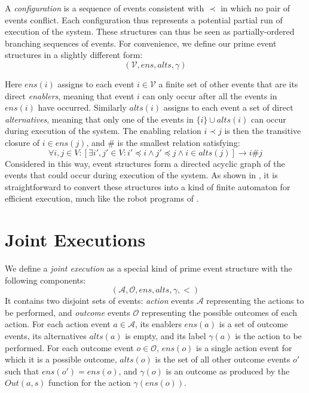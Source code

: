A \emph{configuration} is a sequence of events consistent with $\prec$
in which no pair of events conflict. Each configuration thus represents
a potential partial run of execution of the system. These structures
can thus be seen as partially-ordered branching sequences of events.
For convenience, we define our prime event structures in a slightly
different form:\[
(\mathcal{V},ens,alts,\gamma)\]


Here $ens(i)$ assigns to each event $i\in\mathcal{V}$ a finite set
of other events that are its direct \emph{enablers}, meaning that
event $i$ can only occur after all the events in $ens(i)$ have occurred.
Similarly $alts(i)$ assigns to each event a set of direct \emph{alternatives},
meaning that only one of the events in $\{i\}\cup alts(i)$ can occur
during execution of the system. The enabling relation $i\prec j$
is then the transitive closure of $i\in ens(j)$, and $\#$ is the
smallest relation satisfying:\[
\forall i,j\in V:[\exists i',j'\in V:i'\preceq i\wedge j'\preceq j\wedge i\in alts(j)]\rightarrow i\#j\]
 Considered in this way, event structures form a directed acyclic
graph of the events that could occur during execution of the system.
As shown in \citep{pratt91modeling_conc_with_geom}, it is straightforward
to convert these structures into a kind of finite automaton for efficient
execution, much like the robot programs of \citep{levesque98what_robots_can_do}.


\section{Joint Executions\label{sec:JointExec:JEs}}

We define a \emph{joint execution} as a special kind of prime event
structure with the following components:\[
(\mathcal{A},\mathcal{O},ens,alts,\gamma,<)\]
 It contains two disjoint sets of events: \emph{action} events $\mathcal{A}$
representing the actions to be performed, and \emph{outcome} events
$\mathcal{O}$ representing the possible outcomes of each action.
For each action event $a\in\mathcal{A}$, its enablers $ens(a)$ is
a set of outcome events, its alternatives $alts(a)$ is empty, and
its label $\gamma(a)$ is the action to be performed. For each outcome
event $o\in\mathcal{O}$, $ens(o)$ is a single action event for which
it is a possible outcome, $alts(o)$ is the set of all other outcome
events $o'$ such that $ens(o')=ens(o)$, and $\gamma(o)$ is an outcome
as produced by the $Out(a,s)$ function for the action $\gamma(ens(o))$.

